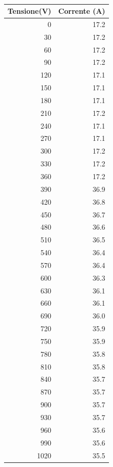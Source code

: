\documentclass[10pt,twocolumn]{article}
\begin{document}
\begin{table}[H]
    \begin{minipage}{0.5\textwidth}
        \centering
        \caption*{}
        \label{tab:temp2}
        \begin{tabular}{|r|r|}
            \hline
            Tensione(V) & Corrente (A) \\ \hline
            0 & 17.2 \\ \hline
            30 & 17.2 \\ \hline
            60 & 17.2 \\ \hline
            90 & 17.2 \\ \hline
            120 & 17.1 \\ \hline
            150 & 17.1 \\ \hline
            180 & 17.1 \\ \hline
            210 & 17.2 \\ \hline
            240 & 17.1 \\ \hline
            270 & 17.1 \\ \hline
            300 & 17.2 \\ \hline
            330 & 17.2 \\ \hline
            360 & 17.2 \\ \hline
            390 & 36.9 \\ \hline
            420 & 36.8 \\ \hline
            450 & 36.7 \\ \hline
            480 & 36.6 \\ \hline
            510 & 36.5 \\ \hline
            540 & 36.4 \\ \hline
            570 & 36.4 \\ \hline
            600 & 36.3 \\ \hline
            630 & 36.1 \\ \hline
            660 & 36.1 \\ \hline
            690 & 36.0 \\ \hline
            720 & 35.9 \\ \hline
            750 & 35.9 \\ \hline
            780 & 35.8 \\ \hline
            810 & 35.8 \\ \hline
            840 & 35.7 \\ \hline
            870 & 35.7 \\ \hline
            900 & 35.7 \\ \hline
            930 & 35.7 \\ \hline
            960 & 35.6 \\ \hline
            990 & 35.6 \\ \hline
            1020 & 35.5 \\ \hline
        \end{tabular}
    \end{minipage}
\end{table}
\end{document}

